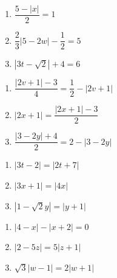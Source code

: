 \documentclass[11pt]{article}
\theoremstyle{definition}  %
\newcounter{HW}
\begin{document}
\begin{multicols}{3}
\begin{enumerate}
\setcounter{enumi}{\value{HW}}

\item $\dfrac{5 - |x|}{2} = 1$ 
\item $\dfrac{2}{3} |5-2w| - \dfrac{1}{2} = 5$ 
\item $|3t - \sqrt{2}| + 4 = 6$ 
\setcounter{HW}{\value{enumi}}
\end{enumerate}
\end{multicols}


\begin{multicols}{3}
\begin{enumerate}
\setcounter{enumi}{\value{HW}}

\item $\dfrac{|2v+1| - 3}{4} = \dfrac{1}{2} - |2v+1|$
\item $|2x+1| = \dfrac{|2x+1| - 3}{2}$
\item $\dfrac{|3-2y|+ 4}{2} = 2 - |3-2y|$

\setcounter{HW}{\value{enumi}}
\end{enumerate}
\end{multicols}



\begin{multicols}{3}
\begin{enumerate}
\setcounter{enumi}{\value{HW}}

\item $|3t - 2| = |2t + 7|$  
\item $|3x+1| = |4x|$
\item $|1-\sqrt{2} y| = |y+1|$

\setcounter{HW}{\value{enumi}}
\end{enumerate}
\end{multicols}


\begin{multicols}{3}
\begin{enumerate}
\setcounter{enumi}{\value{HW}}

\item  $|4-x| - |x+2| = 0$
\item $|2-5z| = 5 |z+1|$
\item $\sqrt{3}|w-1| = 2|w+1|$ \label{solveabsvalequlast}


\setcounter{HW}{\value{enumi}}
\end{enumerate}
\end{multicols}
\end{document}
